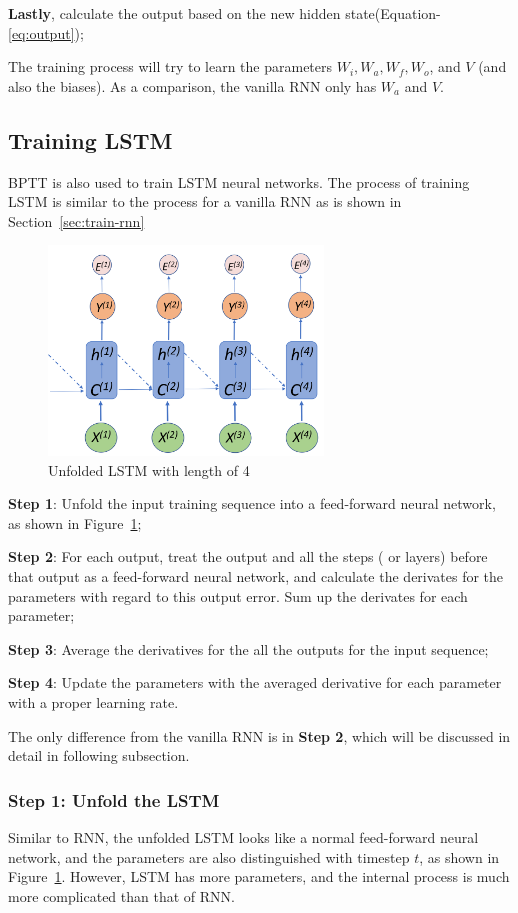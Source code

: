 \documentclass[english]{article}
\begin{document}
\textbf{Lastly}, calculate the output based on the new hidden state(Equation-\ref{eq:output});

The training process will try to learn the parameters $W_i, W_a, W_f, W_o$, and $V$ (and also the biases). As a comparison, the vanilla RNN
only has $W_a$ and $V$.

\subsection{Training LSTM}
BPTT is also used to train LSTM neural networks. The process of training LSTM is similar to the process for a vanilla RNN as is shown in Section~\ref{sec:train-rnn}

\begin{figure}[htbp]
	\centering
	\includegraphics[width=0.65\textwidth, keepaspectratio]{lstm}
	\caption{Unfolded LSTM with length of 4}
	\label{fig:lstm}
\end{figure}


\textbf{Step 1}: Unfold the input training sequence into a feed-forward neural network, as shown in Figure~\ref{fig:lstm};

\textbf{Step 2}: For each output, treat the output and all the steps ( or layers) before that output as a feed-forward neural network,
and calculate the derivates for the parameters with regard to this output error. Sum up the derivates for each parameter;

\textbf{Step 3}: Average the derivatives for the all the outputs for the input sequence;

\textbf{Step 4}: Update the parameters with the averaged derivative for each parameter with a proper learning rate.

The only difference from the vanilla RNN is in \textbf{Step 2}, which will be discussed in detail in following subsection.

\subsubsection{Step 1: Unfold the LSTM}
Similar to RNN, the unfolded LSTM looks like a normal feed-forward neural network, and the parameters are also distinguished with timestep $t$, as shown in Figure~\ref{fig:lstm}. 
However, LSTM has more parameters, and the internal process is much more complicated than that of RNN.
\end{document}
